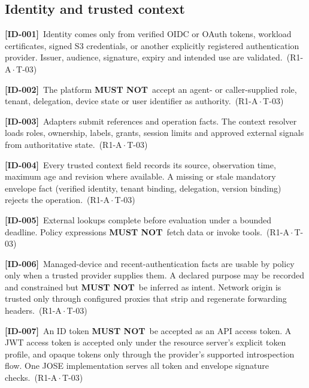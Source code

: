 \documentclass[11pt,a4paper]{article}
\newcommand{\mustnot}{\textbf{MUST NOT}}
\newcommand{\reqtag}[2]{{\footnotesize\color{accent}(#1\,$\cdot$\,#2)}}
\newcommand{\req}[4]{\par\noindent\hypertarget{req:#1}{\textbf{[#1]}}\ #4\ \reqtag{#2}{#3}\par}
\begin{document}
\subsection{Identity and trusted context}
\req{ID-001}{R1-A}{T-03}{Identity comes only from verified OIDC or OAuth tokens, workload certificates, signed S3 credentials, or another explicitly registered authentication provider. Issuer, audience, signature, expiry and intended use are validated.}
\req{ID-002}{R1-A}{T-03}{The platform \mustnot\ accept an agent- or caller-supplied role, tenant, delegation, device state or user identifier as authority.}
\req{ID-003}{R1-A}{T-03}{Adapters submit references and operation facts. The context resolver loads roles, ownership, labels, grants, session limits and approved external signals from authoritative state.}
\req{ID-004}{R1-A}{T-03}{Every trusted context field records its source, observation time, maximum age and revision where available. A missing or stale mandatory envelope fact (verified identity, tenant binding, delegation, version binding) rejects the operation.}
\req{ID-005}{R1-A}{T-03}{External lookups complete before evaluation under a bounded deadline. Policy expressions \mustnot\ fetch data or invoke tools.}
\req{ID-006}{R1-A}{T-03}{Managed-device and recent-authentication facts are usable by policy only when a trusted provider supplies them. A declared purpose may be recorded and constrained but \mustnot\ be inferred as intent. Network origin is trusted only through configured proxies that strip and regenerate forwarding headers.}
\req{ID-007}{R1-A}{T-03}{An ID token \mustnot\ be accepted as an API access token. A JWT access token is accepted only under the resource server's explicit token profile, and opaque tokens only through the provider's supported introspection flow. One JOSE implementation serves all token and envelope signature checks.}
\end{document}
